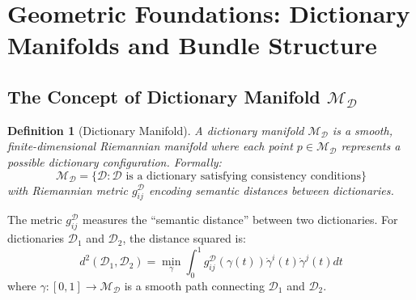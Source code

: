 \documentclass[11pt,a4paper]{article}
\newtheorem{definition}{Definition}
\begin{document}
	\section{Geometric Foundations: Dictionary Manifolds and Bundle Structure}
	\subsection{The Concept of Dictionary Manifold $\mathcal{M}_{\mathcal{D}}$}
	
	\begin{definition}[Dictionary Manifold]
		A dictionary manifold $\mathcal{M}_{\mathcal{D}}$ is a smooth, finite-dimensional Riemannian manifold where each point $p \in \mathcal{M}_{\mathcal{D}}$ represents a possible dictionary configuration. Formally:
		\begin{equation}
			\mathcal{M}_{\mathcal{D}} = \{ \mathcal{D} : \mathcal{D} \text{ is a dictionary satisfying consistency conditions} \}
		\end{equation}
		with Riemannian metric $g_{ij}^{\mathcal{D}}$ encoding semantic distances between dictionaries.
	\end{definition}
	
	The metric $g_{ij}^{\mathcal{D}}$ measures the ``semantic distance'' between two dictionaries. For dictionaries $\mathcal{D}_1$ and $\mathcal{D}_2$, the distance squared is:
	\begin{equation}
		d^2(\mathcal{D}_1, \mathcal{D}_2) = \min_{\gamma} \int_0^1 g_{ij}^{\mathcal{D}}(\gamma(t)) \dot{\gamma}^i(t) \dot{\gamma}^j(t) dt
	\end{equation}
	where $\gamma: [0,1] \to \mathcal{M}_{\mathcal{D}}$ is a smooth path connecting $\mathcal{D}_1$ and $\mathcal{D}_2$.
	
\end{document}
